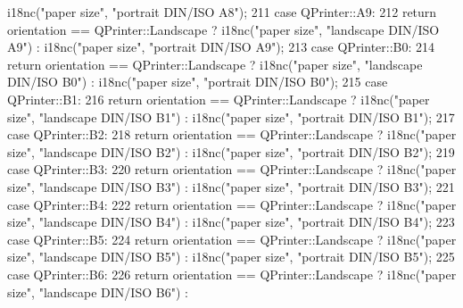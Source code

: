 \begin{DoxyCode}
      i18nc(\textcolor{stringliteral}{"paper size"}, \textcolor{stringliteral}{"portrait DIN/ISO A8"});
211         \textcolor{keywordflow}{case} QPrinter::A9:
212             \textcolor{keywordflow}{return}  orientation == QPrinter::Landscape ? i18nc(\textcolor{stringliteral}{"paper size"}, \textcolor{stringliteral}{"landscape DIN/ISO A9"}) : 
      i18nc(\textcolor{stringliteral}{"paper size"}, \textcolor{stringliteral}{"portrait DIN/ISO A9"});
213         \textcolor{keywordflow}{case} QPrinter::B0:
214             \textcolor{keywordflow}{return}  orientation == QPrinter::Landscape ? i18nc(\textcolor{stringliteral}{"paper size"}, \textcolor{stringliteral}{"landscape DIN/ISO B0"}) : 
      i18nc(\textcolor{stringliteral}{"paper size"}, \textcolor{stringliteral}{"portrait DIN/ISO B0"});
215         \textcolor{keywordflow}{case} QPrinter::B1:
216             \textcolor{keywordflow}{return}  orientation == QPrinter::Landscape ? i18nc(\textcolor{stringliteral}{"paper size"}, \textcolor{stringliteral}{"landscape DIN/ISO B1"}) : 
      i18nc(\textcolor{stringliteral}{"paper size"}, \textcolor{stringliteral}{"portrait DIN/ISO B1"});
217         \textcolor{keywordflow}{case} QPrinter::B2:
218             \textcolor{keywordflow}{return}  orientation == QPrinter::Landscape ? i18nc(\textcolor{stringliteral}{"paper size"}, \textcolor{stringliteral}{"landscape DIN/ISO B2"}) : 
      i18nc(\textcolor{stringliteral}{"paper size"}, \textcolor{stringliteral}{"portrait DIN/ISO B2"});
219         \textcolor{keywordflow}{case} QPrinter::B3:
220             \textcolor{keywordflow}{return}  orientation == QPrinter::Landscape ? i18nc(\textcolor{stringliteral}{"paper size"}, \textcolor{stringliteral}{"landscape DIN/ISO B3"}) : 
      i18nc(\textcolor{stringliteral}{"paper size"}, \textcolor{stringliteral}{"portrait DIN/ISO B3"});
221         \textcolor{keywordflow}{case} QPrinter::B4:
222             \textcolor{keywordflow}{return}  orientation == QPrinter::Landscape ? i18nc(\textcolor{stringliteral}{"paper size"}, \textcolor{stringliteral}{"landscape DIN/ISO B4"}) : 
      i18nc(\textcolor{stringliteral}{"paper size"}, \textcolor{stringliteral}{"portrait DIN/ISO B4"});
223         \textcolor{keywordflow}{case} QPrinter::B5:
224             \textcolor{keywordflow}{return}  orientation == QPrinter::Landscape ? i18nc(\textcolor{stringliteral}{"paper size"}, \textcolor{stringliteral}{"landscape DIN/ISO B5"}) : 
      i18nc(\textcolor{stringliteral}{"paper size"}, \textcolor{stringliteral}{"portrait DIN/ISO B5"});
225         \textcolor{keywordflow}{case} QPrinter::B6:
226             \textcolor{keywordflow}{return}  orientation == QPrinter::Landscape ? i18nc(\textcolor{stringliteral}{"paper size"}, \textcolor{stringliteral}{"landscape DIN/ISO B6"}) : 

\end{DoxyCode}
